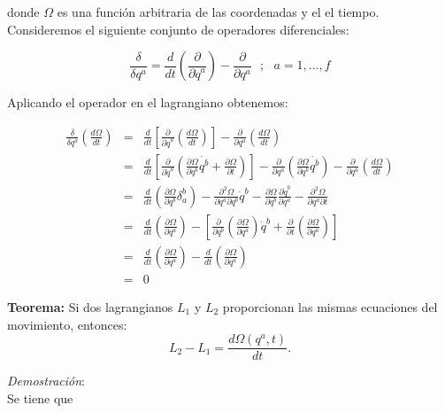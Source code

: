 \documentclass[12pt]{report}
\begin{document}
donde  $\Omega$ es una función arbitraria de las coordenadas y el el tiempo. Consideremos el siguiente conjunto de operadores diferenciales:

\begin{equation}
\frac{\delta}{\delta q^a} = \frac{d}{dt}\left( \frac{\partial}{\partial \dot{q}^a} \right) - \frac{\partial }{\partial q^a} \ \ \ ; \ \ \ a=1,...,f
\end{equation}

Aplicando el operador en el lagrangiano obtenemos:

\begin{eqnarray}
\frac{\delta}{\delta q^a} \left( \frac{d\Omega}{dt} \right) &=& \frac{d}{dt} \left[ \frac{\partial}{\partial \dot{q}^a} \left( \frac{d\Omega}{dt} \right) \right] -\frac{\partial}{\partial q^a} \left( \frac{d\Omega}{dt} \right) \\
&=& \frac{d}{dt} \left[ \frac{\partial}{\partial \dot{q}^a} \left( \frac{\partial \Omega}{\partial q^b} \dot{q^b} + \frac{\partial \Omega}{\partial t} \right)  \right] - \frac{\partial}{\partial q^a} \left( \frac{\partial \Omega}{\partial q^b}\dot{q^b} \right) - \frac{\partial}{\partial q^a} \left( \frac{d\Omega}{dt} \right) \\
&=& \frac{d}{dt} \left( \frac{\partial \Omega}{\partial q^b} \delta_{a}^b \right) - \frac{\partial^2\Omega}{\partial q^a \partial q^b} \dot{q}^b - \frac{\partial \Omega}{\partial q^b} \frac{\partial \dot{q}^b}{\partial q^a}-\frac{\partial^2 \Omega}{\partial q^a \partial t} \\
&=& \frac{d}{dt}\left(\frac{\partial \Omega}{\partial q^a} \right) - \left[ \frac{\partial }{\partial q^b} \left( \frac{\partial \Omega}{\partial q^a} \right)\dot{q}^b + \frac{\partial}{\partial t} \left( \frac{\partial \Omega}{\partial q^a} \right) \right] \\
&=& \frac{d}{dt}\left(\frac{\partial \Omega}{\partial q^a} \right) - \frac{d}{dt}\left(\frac{\partial \Omega}{\partial q^a} \right) \\
&=& 0
\end{eqnarray}


\textbf{Teorema:} Si dos lagrangianos $L_1$ y $L_2$ proporcionan las mismas ecuaciones del movimiento, entonces:
\begin{equation}
L_2 - L_1 = \frac{d\Omega(q^a,t)}{dt}.
\end{equation}


\textit{Demostración}: \\

Se tiene que 
\end{document}
